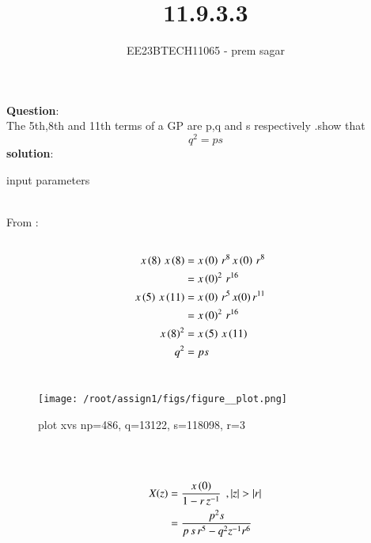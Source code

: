 \documentclass[journal,12pt,twocolumn]{IEEEtran}
\theoremstyle{remark}
\begin{document}

\vspace{3cm}

\title{11.9.3.3}
\author{EE23BTECH11065 - prem sagar}
\maketitle
\newpage

\bigskip 

\renewcommand{\thefigure}{\theenumi}
\renewcommand{\thetable}{\theenumi}
\textbf{Question}:\\ The 5th,8th and 11th terms of a GP are p,q and s respectively .show that \[q^2=ps\]
\textbf{solution}:
\\\begin{table}[!ht]
   \centering
    \renewcommand\thetable{1}
      
    \caption{input parameters}
    \label{tab:11.9.3}
 \end{table}
\\ From :
\begin{align}
\\x\left(8\right)\,x\left(8\right)&=x\left(0\right)\,r^8\,x\left(0\right)\,r^8
     \\ &=x\left(0\right)^2\,r^{16}
\\x\left(5\right)\,x\left({11}\right)&=x\left(0\right)\,r^5\,x(0)\,r^{11}
       \\&=x\left(0\right)^2\,r^{16}
\\x\left(8\right)^2&=x\left(5\right)\,x\left({11}\right)
\\q^2&=ps
\end{align}   
\\\begin{figure}[h]
   \renewcommand\thefigure{1}
    \centering
    \texttt{[image: /root/assign1/figs/figure\_\_plot.png]}
    \caption{plot xvs n\hspace{0.1cm}p=486,
    \hspace{0.1cm}q=13122,
    \hspace{0.1cm}s=118098,
    \hspace{0.1cm}r=3}
    \label{fig:1}
\end{figure}\\
\\\begin{align}
     X(z) &= \frac{x\brak{0}}{1-r\,z^{-1}}\: \:,|z|>|r|
          \\&=\frac{p^2s}{p\,s\,r^5-q^2z^{-1}r^6}
     \end{align}
\end{document}
